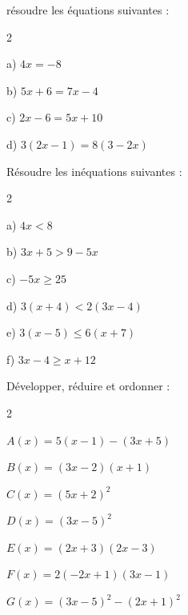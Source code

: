\exo 

résoudre les équations suivantes :

\begin{multicols}{2}

a) $4x =-8$

\medskip

b) $ 5x + 6 = 7x - 4$

\medskip

c) $2x- 6 = 5x + 10$

\medskip

d) $ 3(2x-1)= 8(3-2x)$

\end{multicols}

\exo 

Résoudre les inéquations suivantes :


\begin{multicols}{2}

a) $4x<8$

\medskip

b) $3x+5 > 9-5x$

\medskip

c) $-5x \geqslant 25$

\columnbreak

d) $3(x+4)< 2(3x-4)$

\medskip

e) $3(x-5)\leq 6(x+7)$

\medskip

f) $3x- 4 \geqslant x+12$
 
\end{multicols}

\medskip

\exo 

Développer, réduire et ordonner :

\begin{multicols}{2}

$A(x) = 5(x-1)-(3x+5)$

\medskip

$B(x) = (3x-2)(x+1)$

\medskip

$C(x) = (5x+2)^2$

\medskip

$D(x)= (3x - 5)^2$

\medskip

$E(x)= (2x+3)(2x-3)$

\medskip

$F(x)=2(-2x+1)(3x-1)$

\medskip

$G(x)=(3x-5)^2 - (2x+1)^2$

\end{multicols}

